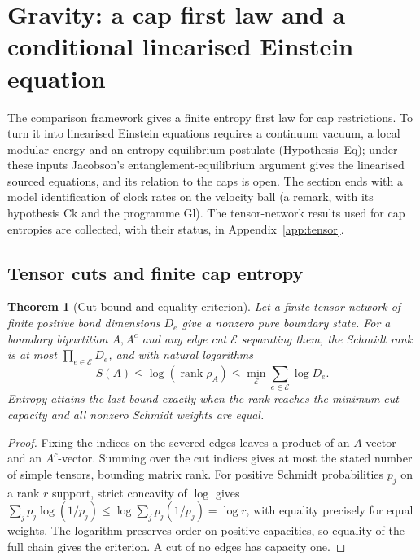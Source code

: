 \documentclass[aps,pra,onecolumn,superscriptaddress,nofootinbib,10pt]{revtex4-2}
\newtheorem{theorem}{Theorem}
\theoremstyle{definition}
\theoremstyle{remark}
\begin{document}
\section{Gravity: a cap first law and a conditional linearised Einstein equation}\label{sec:gravity}
The comparison framework gives a finite entropy first law for cap restrictions.  To turn it into linearised
Einstein equations requires a continuum vacuum, a local modular energy and an entropy equilibrium postulate
(Hypothesis~Eq); under these inputs Jacobson's entanglement-equilibrium argument \cite{ub:jac16} gives the linearised
sourced equations, and its relation to the caps is open.  The section ends with a model identification of
clock rates on the velocity ball (a remark, with its hypothesis Ck and the programme Gl).  The tensor-network
results used for cap entropies are collected, with their status, in Appendix~\ref{app:tensor}.

\subsection{Tensor cuts and finite cap entropy}

\begin{theorem}[Cut bound and equality criterion]\label{ub:cut}
Let a finite tensor network of finite positive bond dimensions
$D_e$ give a nonzero pure boundary state. For a boundary bipartition
$A,A^c$ and any edge cut $\mathcal E$ separating them, the Schmidt
rank is at most $\prod_{e\in\mathcal E}D_e$, and with natural
logarithms
\[
 S(A)\le\log(\operatorname{rank}\rho_A)
         \le\min_{\mathcal E}\sum_{e\in\mathcal E}\log D_e.
\]
Entropy attains the last bound exactly when the rank reaches the
minimum cut capacity and all nonzero Schmidt weights are equal.
\end{theorem}
\begin{proof}
Fixing the indices on the severed edges leaves a product of an
$A$-vector and an $A^c$-vector. Summing over the cut indices gives
at most the stated number of simple tensors, bounding matrix rank.
For positive Schmidt probabilities $p_j$ on a rank $r$ support,
strict concavity of $\log$ gives
$\sum_j p_j\log(1/p_j)\le\log\sum_jp_j(1/p_j)=\log r$,
with equality precisely for equal weights. The logarithm preserves
order on positive capacities, so equality of the full chain gives
the criterion. A cut of no edges has capacity one.
\end{proof}
\end{document}
